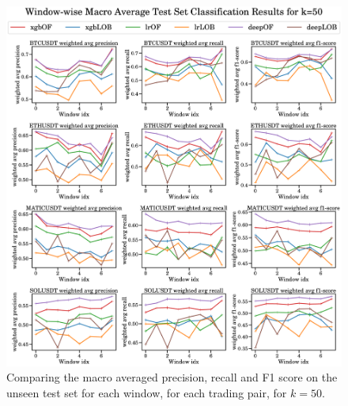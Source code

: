 \begin{figure}[htpb!]
    \centering
    \includegraphics[width=1.0\textwidth]{./images/macro_results_k=50.pdf}
    \caption{Comparing the macro averaged precision, recall and F1 score on the unseen test set for each window, for each trading pair, for $k=50$.}
    \label{macro_plots_3}
\end{figure}

